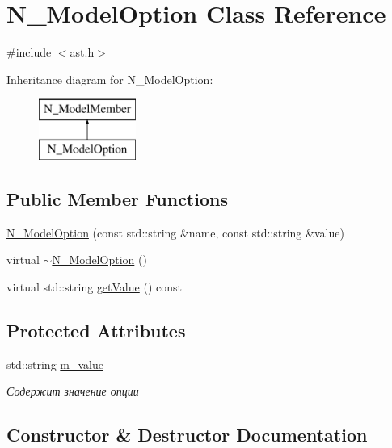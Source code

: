 \hypertarget{classN__ModelOption}{}\section{N\+\_\+\+Model\+Option Class Reference}
\label{classN__ModelOption}


{\ttfamily \#include $<$ast.\+h$>$}

Inheritance diagram for N\+\_\+\+Model\+Option\+:\begin{figure}[H]
\begin{center}
\leavevmode
\includegraphics[height=2.000000cm]{classN__ModelOption}
\end{center}
\end{figure}
\subsection*{Public Member Functions}
\begin{DoxyCompactItemize}
\item 
\hyperlink{classN__ModelOption_ab77b5a4cde32cc2deff1c9e698d3ae42}{N\+\_\+\+Model\+Option} (const std\+::string \&name, const std\+::string \&value)
\item 
virtual \hyperlink{classN__ModelOption_aee181474459327d051cfa58af80586fb}{$\sim$\+N\+\_\+\+Model\+Option} ()
\item 
virtual std\+::string \hyperlink{classN__ModelOption_ae31bab886b932079d6754561bb155121}{get\+Value} () const 
\end{DoxyCompactItemize}
\subsection*{Protected Attributes}
\begin{DoxyCompactItemize}
\item 
std\+::string \hyperlink{classN__ModelOption_ad618798d401e3856f027ba7856359dd7}{m\+\_\+value}
\begin{DoxyCompactList}\small\item\em Содержит значение опции \end{DoxyCompactList}\end{DoxyCompactItemize}


\subsection{Constructor \& Destructor Documentation}
\hypertarget{classN__ModelOption_ab77b5a4cde32cc2deff1c9e698d3ae42}{}
